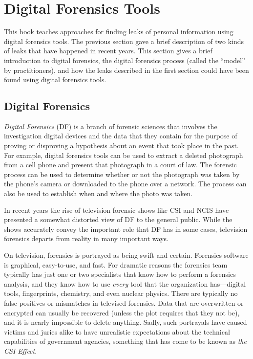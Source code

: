 \section{Digital Forensics Tools}

This book teaches approaches for finding leaks of personal information using
digital forensics tools. The previous section gave a brief description
of two kinds of leaks that have happened in recent years. This
section gives a brief introduction to digital forensics, the digital
forensics process (called the ``model'' by practitioners), and how the
leaks described in the first section could have been found using
digital forensics tools.

\subsection{Digital Forensics}

\emph{Digital Forensics} (DF) is a branch of forensic sciences that
involves the investigation digital devices and the data that they
contain for the purpose of proving or disproving a hypothesis about an
event that took place in the past. For example, digital forensics
tools can be used to extract a deleted photograph from a cell phone
and present that photograph in a court of law. The forensic process
can be used to determine whether or not the photograph was taken by the
phone's camera or downloaded to the phone over a network. The process
can also be used to establish when and where the photo was taken.

In recent years the rise of television forensic shows like CSI and
NCIS have presented a somewhat distorted view of DF to
the general public. While the shows accurately convey the important
role that DF has in some cases, television forensics departs from
reality in many important ways. 

On television, forensics is portrayed as being swift and
certain. Forensics software is graphical, easy-to-use, and fast. For
dramatic reasons the forensics team typically has just one or two
specialists that know how to perform a forensics analysis, and they know how
to use \emph{every} tool that the organization has---digital tools,
fingerprints, chemistry, and even nuclear physics. There are typically
no false positives or mismatches in televised forensics. Data that are
overwritten or encrypted can usually be recovered (unless the plot
requires that they not be), and it is nearly impossible to delete
anything. Sadly, such portrayals have caused victims and  juries alike
to have unrealistic expectations about the technical capabilities of
government agencies, something that has come to be known as \emph{the
  CSI Effect}\cite{csi-effect}\cite{beyond-csi-effect}.

